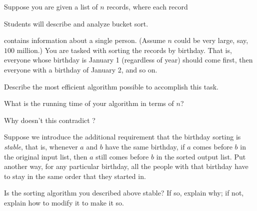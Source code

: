 \documentclass{tufte-handout}
\begin{document}
Suppose you are given a list of $n$ records, where each record
\begin{objective}
  Students will describe and analyze bucket sort.
\end{objective}
contains information about a single person. (Assume $n$ could be very
large, say, $100$ million.)  You are tasked with sorting the records
by birthday.  That is, everyone whose birthday is January 1
(regardless of year) should come first, then everyone with a birthday
of January 2, and so on.

\begin{questions}
\item Describe the most efficient algorithm possible to accomplish
  this task. \vspace{1in}
\item What is the running time of your algorithm in terms of $n$?
\item Why doesn't this contradict ?
\end{questions}

Suppose we introduce the additional requirement that the birthday
sorting is \emph{stable}, that is, whenever $a$ and $b$ have the same
birthday, if $a$ comes before $b$ in the original input list, then $a$
still comes before $b$ in the sorted output list.  Put another way,
for any particular birthday, all the people with that birthday have to
stay in the same order that they started in.

  \begin{questions}
  \item Is the sorting algorithm you described above stable?  If so,
    explain why; if not, explain how to modify it to make it so.
  \end{questions}
\end{document}
